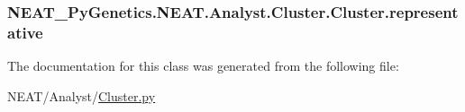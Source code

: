 \subsubsection[{\texorpdfstring{representative}{representative}}]{\setlength{\rightskip}{0pt plus 5cm}N\+E\+A\+T\+\_\+\+Py\+Genetics.\+N\+E\+A\+T.\+Analyst.\+Cluster.\+Cluster.\+representative}\hypertarget{classNEAT__PyGenetics_1_1NEAT_1_1Analyst_1_1Cluster_1_1Cluster_a6d98b217b836b08679f9b20f9459f2ba}{}\label{classNEAT__PyGenetics_1_1NEAT_1_1Analyst_1_1Cluster_1_1Cluster_a6d98b217b836b08679f9b20f9459f2ba}


The documentation for this class was generated from the following file\+:\begin{DoxyCompactItemize}
\item 
N\+E\+A\+T/\+Analyst/\hyperlink{Cluster_8py}{Cluster.\+py}\end{DoxyCompactItemize}
